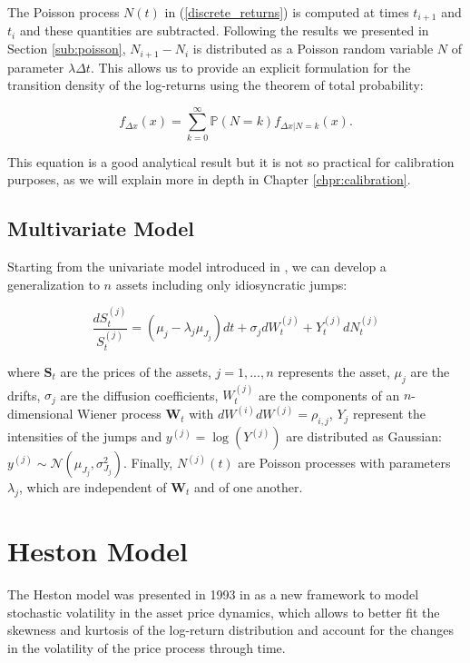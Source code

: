 The Poisson process $N(t)$ in (\ref{discrete_returns}) is computed at times $t_{i+1}$ and $t_i$ and these quantities are subtracted. Following the results we presented in Section \ref{sub:poisson}, $N_{i+1} - N_i$ is distributed as a Poisson random variable $N$ of parameter $\lambda \Delta t$.
This allows us to provide an explicit formulation for the transition density of the log-returns using the theorem of total probability:

\begin{equation}
\label{transitional}
f_{\Delta x} (x) = \sum_{k=0}^{\infty} \mathbb{P}(N = k) f_{\Delta x | N = k}(x) .
\end{equation}

This equation is a good analytical result but it is not so practical for calibration purposes, as we will explain more in depth in Chapter \ref{chpr:calibration}.


\subsection{Multivariate Model}
Starting from the univariate model introduced in \citep{MERTON1976}, we can develop a generalization to $n$ assets including only idiosyncratic jumps:

\begin{equation}
\frac{dS_t^{(j)}}{S_t^{(j)}} = (\mu_j - \lambda_j \mu_{J_j}) dt + \sigma_j dW_t^{(j)} + Y^{(j)}_t dN^{(j)}_t
\end{equation}

where $\mathbf{S}_t$ are the prices of the assets, $j = 1, ...  ,n$ represents the asset, $\mu_j$ are the drifts, $\sigma_j$ are the diffusion coefficients, $W^{(j)}_t$ are the components of an $n$-dimensional Wiener process $ \mathbf{W}_t$ with $dW^{(i)}dW^{(j)}=\rho_{i,j}$, $Y_j$ represent the intensities of the jumps and  $y^{(j)} = \log(Y^{(j)})$ are distributed as Gaussian: $y^{(j)}  \sim \mathcal{N}(\mu_{J_j} , \sigma_{J_j}^2)$. Finally, $N^{(j)}(t)$ are Poisson processes with parameters $\lambda_j$, which are independent of $\mathbf{W}_t$ and of one another. 

\bigskip

\section{Heston Model}
\label{sec:heston}

The Heston model was presented in 1993 in \citep{HESTON93} as a new framework to model stochastic volatility in the asset price dynamics, which allows to better fit the skewness and kurtosis of the log-return distribution and account for the changes in the volatility of the price process through time.

